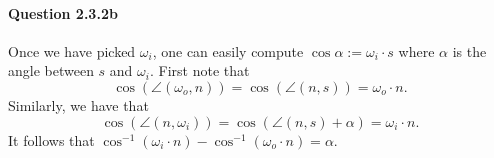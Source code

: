 \documentclass{article}
\begin{document}


\paragraph{Question 2.3.2b}Once we have picked $\omega_i$, one can easily compute\linebreak 
$\cos\alpha := \omega_i \cdot s$ where $\alpha$ is the angle between $s$ and $\omega_i$. First note that $$\cos \left (\angle(\omega_o, n)\right ) = \cos \left ( \angle(n,s) \right ) = \omega_o\cdot n.$$ Similarly, we have that
$$\cos\left(\angle (n, \omega_i)\right) = \cos\left(\angle(n,s) + \alpha\right) = \omega_i \cdot n.$$
It follows that $\cos^{-1}{\left(\omega_i \cdot n\right)} - \cos^{-1}{\left(\omega_o\cdot n\right)} = \alpha.$
\end{document}
